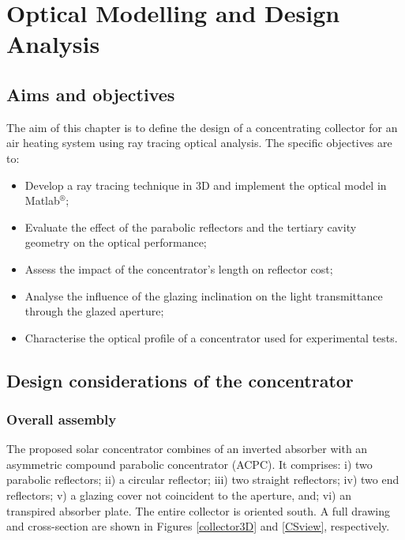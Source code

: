 \chapter{Optical Modelling and Design Analysis}
\label{Cap:Opt}

\section{Aims and objectives}

The aim of this chapter is to define the design of a concentrating collector for an air heating system using ray tracing optical analysis. The specific objectives are to:

\begin{itemize}[topsep=5pt,partopsep=0pt] \itemsep0pt
	\item Develop a ray tracing technique in 3D and implement the optical model in Matlab$^{\circledR}$;
	\item Evaluate the effect of the parabolic reflectors and the tertiary cavity geometry on the optical performance;
	\item Assess the impact of the concentrator's length on reflector cost;
	\item Analyse the influence of the glazing inclination on the light transmittance through the glazed aperture;
	\item Characterise the optical profile of a concentrator used for experimental tests.
\end{itemize}

\section{Design considerations of the concentrator}

\subsection{Overall assembly}

The proposed solar concentrator combines of an inverted absorber with an asymmetric compound parabolic concentrator (ACPC). It comprises: i) two parabolic reflectors; ii) a circular reflector; iii) two straight reflectors; iv) two end reflectors; v) a glazing cover not coincident to the aperture, and; vi) an transpired absorber plate. The entire collector is oriented south. A full drawing and cross-section are shown in Figures \ref{collector3D} and \ref{CSview}, respectively. 


